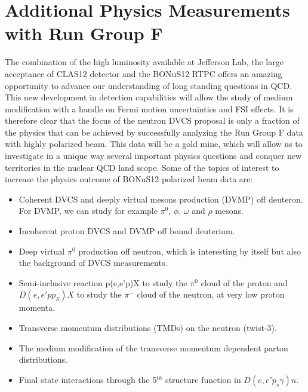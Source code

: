  \chapter{Additional Physics Measurements with Run Group F}
 \label{chap:additional}

The combination of the high luminosity available at Jefferson Lab, the large 
acceptance of CLAS12 detector and the BONuS12 RTPC offers an amazing 
opportunity to advance our understanding of long standing questions in QCD.  
This new development in detection capabilities will allow the study of medium 
modification with a handle on Fermi motion uncertainties and FSI effects. It is 
therefore clear that the focus of the neutron DVCS proposal is only a fraction 
of the physics that can be achieved by successfully analyzing the Run Group F 
data with highly polarized beam. This data will be a gold mine, which will 
allow us to investigate in a unique way several important physics questions and 
conquer new territories in the nuclear QCD land scope. Some of the topics of 
interest to increase the physics outcome of BONuS12 polarized beam data are:

\begin{itemize}
\item Coherent DVCS and deeply virtual mesons production (DVMP) off deuteron.  
   For DVMP, we can study for example $\pi^0$, $\phi$, $\omega$ and $\rho$ 
      mesons.

\item Incoherent proton DVCS and DVMP off bound deuterium.

\item Deep virtual $\pi^0$ production off neutron, which is interesting by 
   itself but also the background of DVCS measurements.
\item Semi-inclusive reaction p(e,e'p)X to study the $\pi^0$ cloud of the 
   proton and $D(e, e' pp_S)X$ to study the $\pi^-$ cloud of the neutron, at 
      very low proton momenta.
   \item Transverse momentum distributions (TMDs) on the neutron (twist-3).
\item The medium modification of the transverse momentum dependent parton 
   distributions.
\item Final state interactions through the 5$^{th}$ structure function in 
$D(e,e'p_s\gamma)n$.  \end{itemize}

